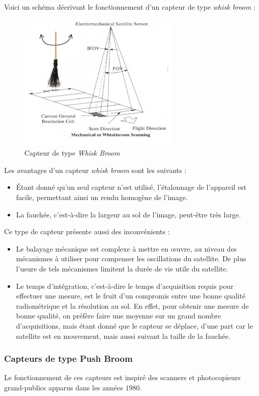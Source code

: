 \documentclass[a4paper, 10pt]{report}
\begin{document}
Voici un schéma décrivant le fonctionnement d'un capteur de type \emph{whisk broom} :
\begin{figure}[H]
	\begin{center}
		\includegraphics[scale=0.7]{Images/Whisk_Broom.jpg}
		\caption{Capteur de type \emph{Whisk Broom}}
	\end{center}
\end{figure}
Les avantages d'un capteur \emph{whisk broom} sont les suivants :
\begin{itemize}
	\item Étant donné qu'un seul capteur n'est utilisé, l'étalonnage de l'appareil est facile, permettant ainsi un rendu homogène de l'image.
	\item La fauchée, c'est-à-dire la largeur au sol de l'image, peut-être très large.
\end{itemize}
Ce type de capteur présente aussi des inconvénients :
\begin{itemize}
	\item Le balayage mécanique est complexe à mettre en œuvre, au niveau des mécanismes à utiliser pour compenser les oscillations du satellite. De plus l'usure de tels mécanismes limitent la durée de vie utile du satellite.
	\item Le temps d'intégration, c'est-à-dire le temps d'acquisition requis pour effectuer une mesure, est le fruit d'un compromis entre une bonne qualité radiométrique et la résolution au sol. En effet, pour obtenir une mesure de bonne qualité, on préfère faire une moyenne sur un grand nombre d'acquisitions, mais étant donné que le capteur se déplace, d'une part car le satellite est en mouvement, mais aussi suivant la taille de la fauchée.
\end{itemize}
\subsubsection{Capteurs de type Push Broom}
Le fonctionnement de ces capteurs est inspiré des scanners et photocopieurs grand-publics apparus dans les années $1980$.
\end{document}
